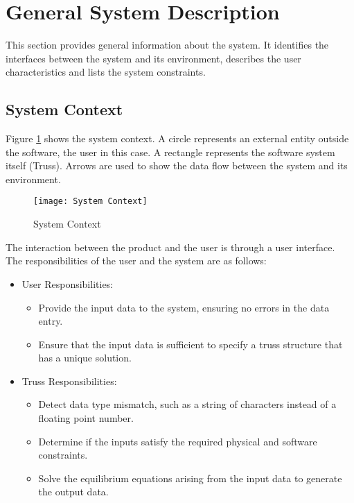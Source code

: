 \documentclass[12pt]{article}
\begin{document}
\section{General System Description}

This section provides general information about the system.  It identifies the
interfaces between the system and its environment, describes the user
characteristics and lists the system constraints.  

\subsection{System Context}

Figure \ref{Fig_SystemContext} shows the system context. A circle represents an 
external entity outside the software, the user in this case. A rectangle 
represents the software system itself (Truss). Arrows are used to show the data 
flow between the system and its environment. \\

\begin{figure}[h!]
\begin{center}
 \texttt{[image: System Context]}
\caption{System Context}
\label{Fig_SystemContext} 
\end{center}
\end{figure}

The interaction between the product and the user is through a user interface. 
The responsibilities of the user and the system are as follows:

\begin{itemize}
\item User Responsibilities:
\begin{itemize}
\item Provide the input data to the system, ensuring no errors in the data 
entry.
\item Ensure that the input data is sufficient to specify a truss structure 
that has a unique solution.
\end{itemize}
\item Truss Responsibilities:
\begin{itemize}
\item Detect data type mismatch, such as a string of characters instead of a
  floating point number.
\item Determine if the inputs satisfy the required physical and software 
constraints.
\item Solve the equilibrium equations arising from the input data to generate 
the output data.
\end{itemize}
\end{itemize}
\end{document}
